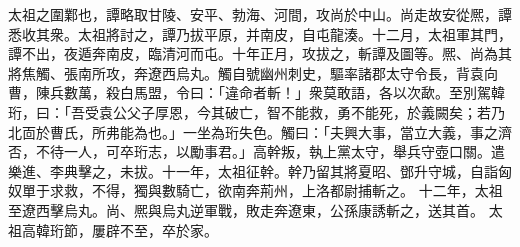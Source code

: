 \begin{pinyinscope}
 
太祖之圍鄴也，譚略取甘陵、安平、勃海、河間，攻尚於中山。尚走故安從熈，譚悉收其衆。太祖將討之，譚乃拔平原，并南皮，自屯龍湊。十二月，太祖軍其門，譚不出，夜遁奔南皮，臨清河而屯。十年正月，攻拔之，斬譚及圖等。熈、尚為其將焦觸、張南所攻，奔遼西烏丸。觸自號幽州刺史，驅率諸郡太守令長，背袁向曹，陳兵數萬，殺白馬盟，令曰：「違命者斬！」衆莫敢語，各以次歃。至別駕韓珩，曰：「吾受袁公父子厚恩，今其破亡，智不能救，勇不能死，於義闕矣；若乃北靣於曹氏，所弗能為也。」一坐為珩失色。觸曰：「夫興大事，當立大義，事之濟否，不待一人，可卒珩志，以勵事君。」高幹叛，執上黨太守，舉兵守壺口關。遣樂進、李典擊之，未拔。十一年，太祖征幹。幹乃留其將夏昭、鄧升守城，自詣匈奴單于求救，不得，獨與數騎亡，欲南奔荊州，上洛都尉捕斬之。
 十二年，太祖至遼西擊烏丸。尚、熈與烏丸逆軍戰，敗走奔遼東，公孫康誘斬之，送其首。
 太祖高韓珩節，屢辟不至，卒於家。
 
 
\end{pinyinscope}